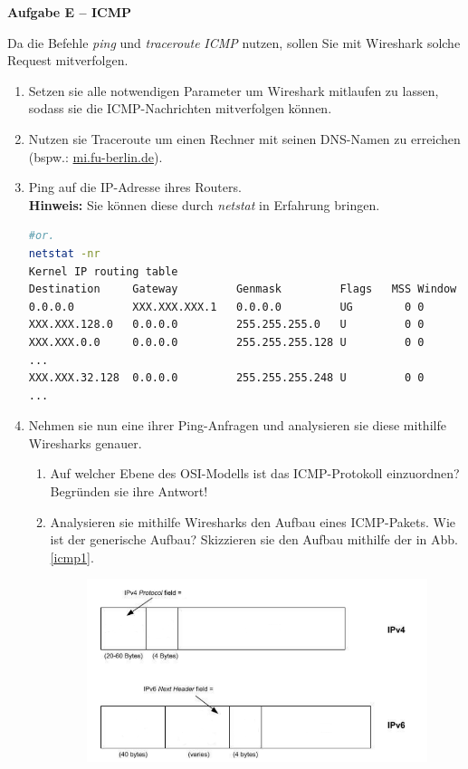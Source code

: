 \documentclass[paper=a4,fontsize=11pt]{scrartcl}%
\numberwithin{equation}{section}
\begin{document}
\begin{center}\Large{\textbf{Aufgabe E -- ICMP}}\end{center}\vskip0.2in
Da die Befehle \emph{ping} und \emph{traceroute} \emph{ICMP} nutzen, sollen Sie mit Wireshark solche Request mitverfolgen.
\begin{enumerate}
	\item Setzen sie alle notwendigen Parameter um Wireshark mitlaufen zu lassen, sodass sie die ICMP-Nachrichten mitverfolgen können.
	\item Nutzen sie Traceroute um einen Rechner mit seinen DNS-Namen zu erreichen (bspw.: \url{mi.fu-berlin.de}).
	\item Ping auf die IP-Adresse ihres Routers. \\\textbf{Hinweis:} Sie können diese durch \emph{netstat} in Erfahrung bringen. 
	\begin{lstlisting}[style=Bash, language=Bash]
#or.
netstat -nr
Kernel IP routing table
Destination     Gateway         Genmask         Flags   MSS Window  irtt Iface
0.0.0.0         XXX.XXX.XXX.1   0.0.0.0         UG        0 0          0 pf-bridge
XXX.XXX.128.0   0.0.0.0         255.255.255.0   U         0 0          0 igb0
XXX.XXX.0.0     0.0.0.0         255.255.255.128 U         0 0          0 igb1
...
XXX.XXX.32.128  0.0.0.0         255.255.255.248 U         0 0          0 igb3
...
	\end{lstlisting}
	\item Nehmen sie nun eine ihrer Ping-Anfragen und analysieren sie diese mithilfe Wiresharks genauer.
	\begin{enumerate}
		\item Auf welcher Ebene des OSI-Modells ist das ICMP-Protokoll einzuordnen? Begründen sie ihre Antwort!
		\item Analysieren sie mithilfe Wiresharks den Aufbau eines ICMP-Pakets. Wie ist der generische Aufbau? Skizzieren sie den Aufbau mithilfe der in Abb. \ref{icmp1}.
		\begin{figure}[H]
		\centering
		\includegraphics[scale=0.5]{icmp1}

\end{figure}
\end{enumerate}
\end{enumerate}
\end{document}
